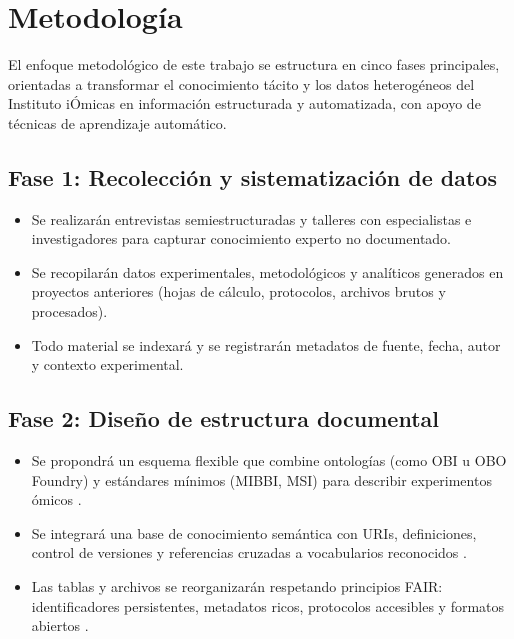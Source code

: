 \section{Metodología}

El enfoque metodológico de este trabajo se estructura en cinco fases principales, orientadas a transformar el conocimiento tácito y los datos heterogéneos del Instituto iÓmicas en información estructurada y automatizada, con apoyo de técnicas de aprendizaje automático.

\subsection{Fase 1: Recolección y sistematización de datos}
\begin{itemize}
  \item Se realizarán entrevistas semiestructuradas y talleres con especialistas e investigadores para capturar conocimiento experto no documentado.
  \item Se recopilarán datos experimentales, metodológicos y analíticos generados en proyectos anteriores (hojas de cálculo, protocolos, archivos brutos y procesados).
  \item Todo material se indexará y se registrarán metadatos de fuente, fecha, autor y contexto experimental.
\end{itemize}

\subsection{Fase 2: Diseño de estructura documental}
\begin{itemize}
  \item Se propondrá un esquema flexible que combine ontologías (como OBI u OBO Foundry) y estándares mínimos (MIBBI, MSI) para describir experimentos ómicos \cite{OBI,MSI_framework}.
  \item Se integrará una base de conocimiento semántica con URIs, definiciones, control de versiones y referencias cruzadas a vocabularios reconocidos \cite{OBI} \cite{MSI_framework}.
  \item Las tablas y archivos se reorganizarán respetando principios FAIR: identificadores persistentes, metadatos ricos, protocolos accesibles y formatos abiertos \cite{BeFAIR} \cite{DatosFAIR}.
\end{itemize}

